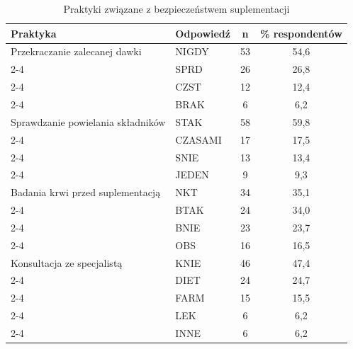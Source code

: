 \begin{table}[H]
    \centering
    \caption{Praktyki związane z bezpieczeństwem suplementacji}
    \label{tab:merged}
    \begin{tabular}{|l|l|c|c|}
        \hline
        \textbf{Praktyka} &
        \textbf{Odpowiedź} &
        \textbf{n} &
        \textbf{\% respondentów} \\
        \hline\hline
        Przekraczanie zalecanej dawki & NIGDY & 53 & 54,6 \\
        \cline{2-4}
        & SPRD    & 26 & 26,8 \\
        \cline{2-4}
        & CZST    & 12 & 12,4 \\
        \cline{2-4}
        & BRAK    &  6 &  6,2 \\
        \hline
        Sprawdzanie powielania składników & STAK & 58 & 59,8 \\
        \cline{2-4}
        & CZASAMI  & 17 & 17,5 \\
        \cline{2-4}
        & SNIE      & 13 & 13,4 \\
        \cline{2-4}
        & JEDEN    &  9 &  9,3 \\
        \hline
        Badania krwi przed suplementacją & NKT & 34 & 35,1 \\
        \cline{2-4}
        & BTAK   & 24 & 34,0 \\
        \cline{2-4}
        & BNIE   & 23 & 23,7 \\
        \cline{2-4}
        & OBS   & 16 & 16,5 \\
        \hline
        Konsultacja ze specjalistą & KNIE & 46 & 47,4 \\
        \cline{2-4}
        & DIET & 24 & 24,7 \\
        \cline{2-4}
        & FARM & 15 & 15,5 \\
        \cline{2-4}
        & LEK & 6 & 6,2 \\
        \cline{2-4}
        & INNE & 6 & 6,2 \\
        \hline
    \end{tabular}
    \begin{minipage}{\textwidth}
        \vspace{0,1cm}

\end{minipage}
\end{table}
